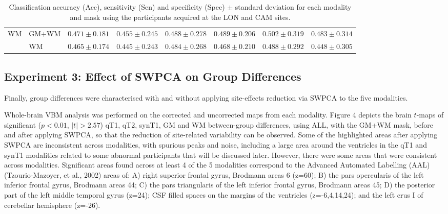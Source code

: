 \begin{table}
\begin{tabularx}{\textwidth}{XX|XXX|XXX}
		\midrule
		\multirow{2}{*}{\ac{WM}} &GM+WM &		$ 0.471 \pm 0.181 $ & $ 0.455 \pm 0.245 $ & $ 0.488 \pm 0.278 $ & $ 0.489 \pm 0.206 $ & $ 0.502 \pm 0.319 $ &  $ 0.483 \pm 0.314 $ \\
		&		WM &		$ 0.465 \pm 0.174 $ & $ 0.445 \pm 0.243 $ & $ 0.484 \pm 0.268 $ & $ 0.468 \pm 0.210 $ & $ 0.488 \pm 0.292 $ &  $ 0.448 \pm 0.305 $ \\
		\bottomrule
	\end{tabularx}
	\caption[Classification accuracy (Acc), sensitivity (Sen) and specificity (Spec) $\pm$ standard deviation for each modality and mask using the participants acquired at the LON and CAM sites.]{Classification accuracy (Acc), sensitivity (Sen) and specificity (Spec) $\pm$ standard deviation for each modality and mask using the participants acquired at the LON and CAM sites.}
	\label{tab:swpcaLONCAM}
\end{table}



\subsection{Experiment 3: Effect of SWPCA on Group Differences}\label{sec:swpcaE3}
Finally, group differences were characterised with and without applying
site-effects reduction via SWPCA to the five modalities. 

Whole-brain \ac{VBM} analysis was performed on the corrected and uncorrected
maps from each modality. Figure 4 depicts the brain $t$-maps
of significant ($p<0.01$, $|t|>2.57$) \ac{qT1}, \ac{qT2}, \ac{synT1}, \ac{GM} and \ac{WM} between-group differences, using ALL, with the GM+WM mask,
before and after applying \ac{SWPCA}, so that the reduction of site-related
variability can be observed. Some of the highlighted areas after
applying \ac{SWPCA} are inconsistent across modalities, with spurious peaks
and noise, including a large area around the ventricles in the \ac{qT1} and
\ac{synT1} modalities related to some abnormal participants that will be
discussed later. However, there were some areas that were consistent
across modalities. Significant areas found across at least 4 of the 5
modalities correspond to the Advanced Automated Labelling (AAL)
(Tzourio-Mazoyer, et al., 2002) areas of: A) right superior frontal
gyrus, Brodmann areas 6 (z=60); B) the pars opercularis of the left
inferior frontal gyrus, Brodmann areas 44; C) the pars triangularis of
the left inferior frontal gyrus, Brodmann areas 45; D) the posterior
part of the left middle temporal gyrus (z=24); CSF filled spaces on the
margins of the ventricles (z=-6,4,14,24); and the left crus I of
cerebellar hemisphere (z=-26).

